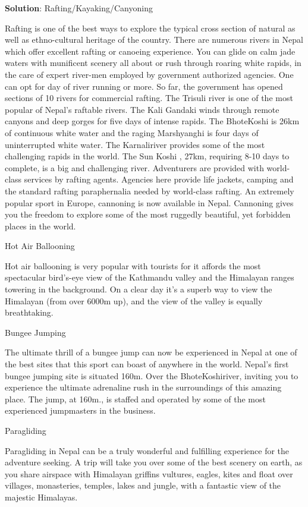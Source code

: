 \documentclass[
  openany]{book}
\newenvironment{solution}{ {\bfseries Solution}:}{}
\begin{document}
\begin{questions}
\begin{solution}
Rafting/Kayaking/Canyoning

Rafting  is one of the best ways to explore the typical cross section of natural as well as ethno-cultural heritage of the country. There are numerous rivers in Nepal which offer excellent rafting or canoeing experience. You can glide on calm jade waters with munificent scenery all about or rush through roaring white rapids, in the care of expert river-men employed by government authorized agencies. One can opt for day of river running or more. So far, the government has opened sections of 10 rivers for commercial rafting. The Trisuli river  is one of the most popular of Nepal’s raftable rivers. The Kali Gandaki winds through remote canyons and deep gorges for five days of intense rapids. The BhoteKoshi is 26km of continuous white water and the raging Marshyanghi is four days of uninterrupted white water. The Karnaliriver provides some of the most challenging rapids in the world. The Sun Koshi , 27km, requiring 8-10 days to complete, is a big and challenging river. Adventurers are provided with world-class services by rafting agents. Agencies here provide life jackets, camping and the standard rafting paraphernalia needed by world-class rafting. An extremely popular sport in Europe, cannoning is now available in Nepal. Cannoning gives you the freedom to explore some of the most ruggedly beautiful, yet forbidden places in the world.

Hot Air Ballooning

Hot air ballooning is very popular with tourists for it affords the most spectacular bird's-eye view of the Kathmandu valley and the Himalayan ranges towering in the background. On a clear day it's a superb way to view the Himalayan (from over 6000m up), and the view of the valley is equally breathtaking.

Bungee Jumping

The ultimate thrill of a bungee jump can now be experienced in Nepal at one of the best sites that this sport can boast of anywhere in the world. Nepal's first bungee jumping site is situated 160m. Over the BhoteKoshiriver, inviting you to experience the ultimate adrenaline rush in the surroundings of this amazing place. The jump, at 160m., is staffed and operated by some of the most experienced jumpmasters in the business.

Paragliding

Paragliding in Nepal can be a truly wonderful and fulfilling experience for the adventure seeking. A trip will take you over some of the best scenery on earth, as you share airspace with Himalayan griffins vultures, eagles, kites and float over villages, monasteries, temples, lakes and jungle, with a fantastic view of the majestic Himalayas.


\end{solution}
\end{questions}
\end{document}
